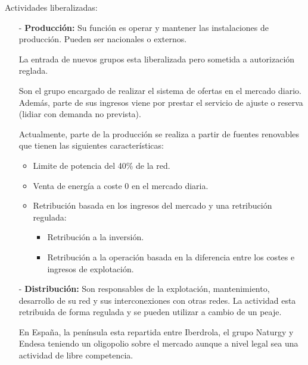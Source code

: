 Actividades liberalizadas:
\begin{itemize}
	\item [-] \textbf{Producción:} Su función es operar y mantener las instalaciones de producción. Pueden ser nacionales o externos.
	
	
	La entrada de nuevos grupos esta liberalizada pero sometida a autorización reglada.
	
	
	Son el grupo encargado de realizar el sistema de ofertas en el mercado diario. Además, parte de sus ingresos viene por prestar el servicio de ajuste o reserva (lidiar con demanda no prevista).
	
	
	Actualmente, parte de la producción se realiza a partir de fuentes renovables que tienen las siguientes características:
	\begin{itemize}
		\item Limite de potencia del 40\% de la red.
		\item Venta de energía a coste 0 en el mercado diaria.
		\item Retribución basada en los ingresos del mercado y una retribución regulada:
		\begin{itemize}
			\item Retribución a la inversión.
			\item Retribución a la operación basada en la diferencia entre los costes e ingresos de explotación.
		\end{itemize}
	\end{itemize}
	\item [-] \textbf{Distribución:} Son responsables de la explotación, mantenimiento, desarrollo de su red y sus interconexiones con
	otras redes. La actividad esta retribuida de forma regulada y se pueden utilizar a cambio de un peaje. 
	
	
	En España, la península esta repartida entre Iberdrola, el grupo Naturgy y Endesa teniendo un oligopolio sobre el mercado aunque a nivel legal sea una actividad de libre competencia.
	

\end{itemize}
